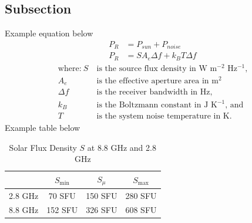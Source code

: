 \documentclass[titlepage]{article}
\begin{document}
\subsection{Subsection}
Example equation below
\begin{align} \label{eq:power}
    P_{R} &= P_{sun} + P_{noise} \\
    P_{R} &= S A_e \Delta f + k_B T \Delta f \nonumber
\end{align}
\begin{align*}
    \text{where:}~S ~&\text{is the source flux density in W m$^{-2}$ Hz$^{-1}$,}\\
    A_e             ~&\text{is the effective aperture area in m$^2$}\\
    \Delta f        ~&\text{is the receiver bandwidth in Hz,}\\
    k_B             ~&\text{is the Boltzmann constant in J K$^{-1}$, and}\\
    T               ~&\text{is the system noise temperature in K.}
\end{align*}
Example table below
\begin{table}[!ht]
\centering
\begin{tabular}{c|c|c|c}
    & $S_{\min}$ & $S_{\mu}$ & $S_{\max}$ \\ \hline
    2.8 GHz & 70 SFU & 150 SFU & 280 SFU \\
    8.8 GHz & 152 SFU & 326 SFU & 608 SFU
\end{tabular}
\caption{Solar Flux Density $S$ at 8.8 GHz and 2.8 GHz} \label{tab:sfd}
\end{table}
\end{document}
